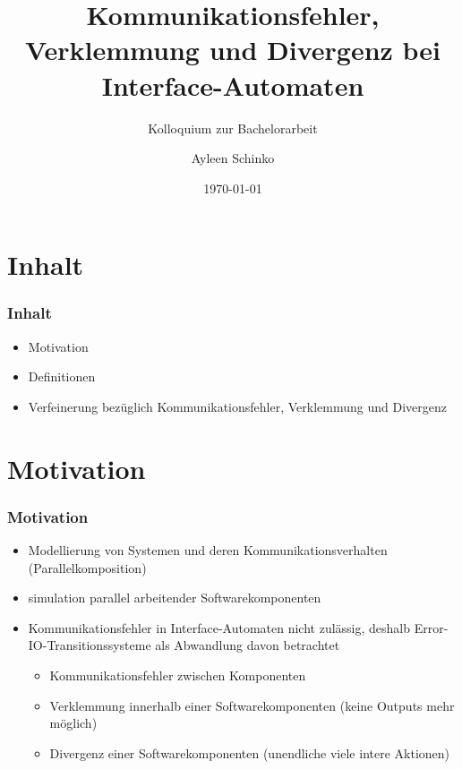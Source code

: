 \documentclass[mathserif, xcolor=dvipsnames]{beamer}
\title{Kommunikationsfehler, Verklemmung und Divergenz bei Interface-Automaten}
\subtitle{Kolloquium zur Bachelorarbeit}
\author{Ayleen Schinko}
\date{\today}
\begin{document}
\begin{frame}[plain]
\maketitle
\end{frame}
\section{Inhalt}
\begin{frame}
  \frametitle{Inhalt}
  \begin{itemize}
      \item Motivation
      \item Definitionen
      \item Verfeinerung bezüglich Kommunikationsfehler, Verklemmung und
        Divergenz
  \end{itemize}
\end{frame}

\section{Motivation}
\begin{frame}
  \frametitle{Motivation}
  \begin{itemize}
    \item Modellierung von Systemen und deren Kommunikationsverhalten
      (Parallelkomposition)
    \item simulation parallel arbeitender Softwarekomponenten
    \item Kommunikationsfehler in Interface-Automaten nicht zulässig, deshalb
      Error-IO-Transitionssysteme als Abwandlung davon betrachtet
      \begin{itemize}
        \item Kommunikationsfehler zwischen Komponenten
        \item Verklemmung innerhalb einer Softwarekomponenten (keine Outputs
          mehr möglich)
        \item Divergenz einer Softwarekomponenten (unendliche viele intere
          Aktionen)
      \end{itemize}
  \end{itemize}
\end{frame}
\end{document}

